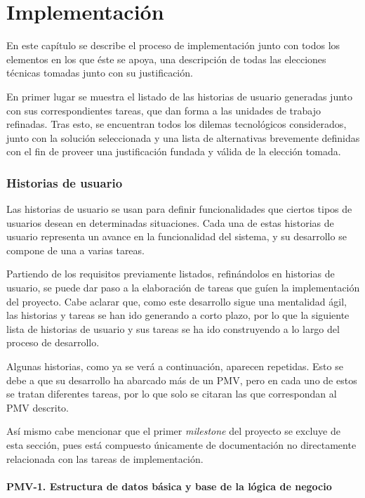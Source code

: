 \chapter{Implementación}

En este capítulo se describe el proceso de implementación junto con todos los elementos en los que éste se apoya, una descripción de todas las elecciones técnicas tomadas junto con su justificación.

En primer lugar se muestra el listado de las historias de usuario generadas junto con sus correspondientes tareas, que dan forma a las unidades de trabajo refinadas. Tras esto, se encuentran todos los dilemas tecnológicos considerados, junto con la solución seleccionada y  una lista de alternativas brevemente definidas con el fin de proveer una justificación fundada y válida de la elección tomada.

\subsection{Historias de usuario}

Las historias de usuario se usan para definir funcionalidades que ciertos tipos de usuarios desean en determinadas situaciones. Cada una de estas historias de usuario representa un avance en la funcionalidad del sistema, y su desarrollo se compone de una a varias tareas.

Partiendo de los requisitos previamente listados, refinándolos en historias de usuario, se puede dar paso a la elaboración de tareas que guíen la implementación del proyecto. Cabe aclarar que, como este desarrollo sigue una mentalidad ágil, las historias y tareas se han ido generando a corto plazo, por lo que la siguiente lista de historias de usuario y sus tareas se ha ido construyendo a lo largo del proceso de desarrollo.

Algunas historias, como ya se verá a continuación, aparecen repetidas. Esto se debe a que su desarrollo ha abarcado más de un PMV, pero en cada uno de estos se tratan diferentes tareas, por lo que solo se citaran las que correspondan al PMV descrito.

Así mismo cabe mencionar que el primer \textit{milestone} del proyecto se excluye de esta sección, pues está compuesto únicamente de documentación no directamente relacionada con las tareas de implementación.

\subsubsection{PMV-1. Estructura de datos básica y base de la lógica de negocio}


